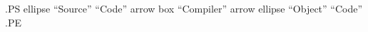 
\newenvironment{centergpic}{}{\begin{center}~\box\graph~\end{center}}
\begin{centergpic}
  .PS
  ellipse ``Source'' ``Code''
  arrow
  box ``Compiler''
  arrow
  ellipse ``Object'' ``Code''
  .PE
\end{centergpic}

